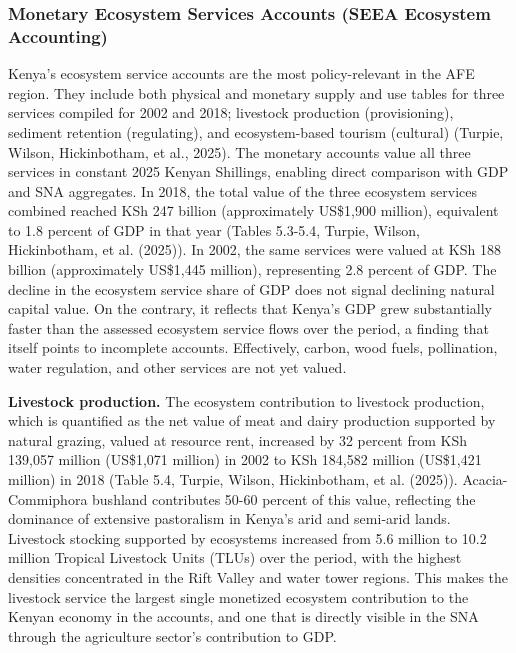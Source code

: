 \documentclass[
  letterpaper,
  DIV=11,
  numbers=noendperiod]{scrartcl}
\begin{document}
\subsubsection{Monetary Ecosystem Services Accounts (SEEA Ecosystem
Accounting)}\label{monetary-ecosystem-services-accounts-seea-ecosystem-accounting}

Kenya's ecosystem service accounts are the most policy-relevant in the
AFE region. They include both physical and monetary supply and use
tables for three services compiled for 2002 and 2018; livestock
production (provisioning), sediment retention (regulating), and
ecosystem-based tourism (cultural) (Turpie, Wilson, Hickinbotham, et
al., 2025). The monetary accounts value all three services in constant
2025 Kenyan Shillings, enabling direct comparison with GDP and SNA
aggregates. In 2018, the total value of the three ecosystem services
combined reached KSh 247 billion (approximately US\$1,900 million),
equivalent to 1.8 percent of GDP in that year (Tables 5.3-5.4, Turpie,
Wilson, Hickinbotham, et al. (2025)). In 2002, the same services were
valued at KSh 188 billion (approximately US\$1,445 million),
representing 2.8 percent of GDP. The decline in the ecosystem service
share of GDP does not signal declining natural capital value. On the
contrary, it reflects that Kenya's GDP grew substantially faster than
the assessed ecosystem service flows over the period, a finding that
itself points to incomplete accounts. Effectively, carbon, wood fuels,
pollination, water regulation, and other services are not yet valued.

\textbf{Livestock production.} The ecosystem contribution to livestock
production, which is quantified as the net value of meat and dairy
production supported by natural grazing, valued at resource rent,
increased by 32 percent from KSh 139,057 million (US\$1,071 million) in
2002 to KSh 184,582 million (US\$1,421 million) in 2018 (Table 5.4,
Turpie, Wilson, Hickinbotham, et al. (2025)). Acacia-Commiphora bushland
contributes 50-60 percent of this value, reflecting the dominance of
extensive pastoralism in Kenya's arid and semi-arid lands. Livestock
stocking supported by ecosystems increased from 5.6 million to 10.2
million Tropical Livestock Units (TLUs) over the period, with the
highest densities concentrated in the Rift Valley and water tower
regions. This makes the livestock service the largest single monetized
ecosystem contribution to the Kenyan economy in the accounts, and one
that is directly visible in the SNA through the agriculture sector's
contribution to GDP.
\end{document}
